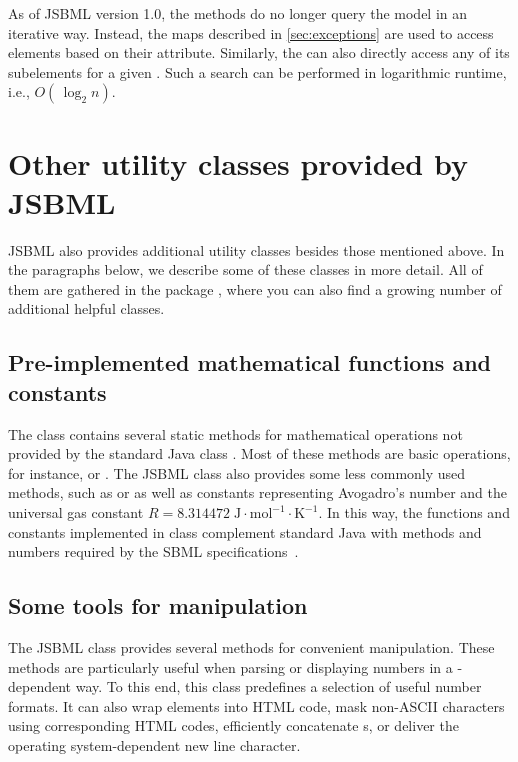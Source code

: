 As of JSBML version 1.0, the  methods do no longer query the
model in an iterative way. Instead, the maps described in
\vref{sec:exceptions} are used to access elements based on their 
attribute. Similarly, the \SBMLDocument can also directly access any of its
subelements for a given . Such a search can be performed in
logarithmic runtime, i.e., $O(\,\log_2 n)$.


\section{Other utility classes provided by JSBML}

JSBML also provides additional utility classes besides those mentioned
above. In the paragraphs below, we describe some of these classes in more
detail.  All of them are gathered in the package
, where you can also find a growing number of
additional helpful classes.

\subsection{Pre-implemented mathematical functions and constants}

The class 
%
contains several static methods for mathematical operations not provided by
the standard Java class . Most of these methods are
basic operations, for instance,  or .  The JSBML class  also provides some less commonly used
methods, such as  or  as well as
 constants representing Avogadro's number and the universal
gas constant
$R = 8.314472\;\mathrm{J}\cdot\mathrm{mol}^{-1}\cdot\mathrm{K}^{-1}$.
In this way, the functions and constants implemented in class 
complement standard Java with methods and numbers required by the SBML
specifications~\citep{Hucka2003, Hucka2008, Hucka2010a}.

\subsection{Some tools for  manipulation}

The JSBML class \StringTools provides several methods for convenient
\String manipulation. These methods are particularly useful when parsing or
displaying  numbers in a \hyp{}dependent way. To
this end, this class predefines a selection of useful number formats. It
can also wrap \String elements into HTML code, mask non-ASCII characters
using corresponding HTML codes, efficiently concatenate \String{}s, or
deliver the operating system-dependent new line character.


